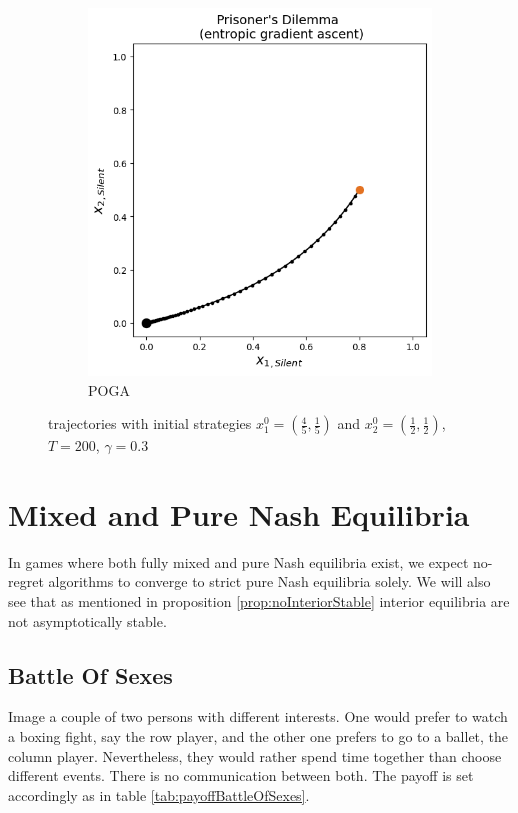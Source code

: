 \begin{figure}[H]
\begin{subfigure}{.5\textwidth}
    \includegraphics[width=\textwidth]{logos/Prisoner5.png}
    \caption{POGA}
\end{subfigure}
\caption{trajectories with initial strategies $x_{1}^0 = (\frac{4}{5},\frac{1}{5})$ and $x_{2}^0 = (\frac{1}{2},\frac{1}{2})$, $T = 200$, $\gamma = 0.3$}
\label{fig:Prisoner2}
\end{figure}


\section{Mixed and Pure Nash Equilibria}\label{section:MixedandPureNashEquilibria}

In games where both fully mixed and pure Nash equilibria exist, we expect no-regret algorithms to converge to strict pure Nash equilibria solely. We will also see that as mentioned in proposition \ref{prop:noInteriorStable} interior equilibria are not asymptotically stable.

\subsection{Battle Of Sexes}\label{subsection:battleOfSexes}

Image a couple of two persons with different interests. One would prefer to watch a boxing fight, say the row player, and the other one prefers to go to a ballet, the column player. Nevertheless, they would rather spend time together than choose different events. There is no communication between both. The payoff is set accordingly as in table \ref{tab:payoffBattleOfSexes}.

